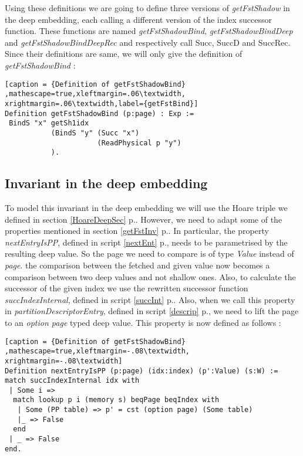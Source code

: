 Using these definitions we are going to define three versions of \textit{getFstShadow} in the deep embedding, each calling a different version of the index successor function. These functions are named \textit{getFstShadowBind}, \textit{getFstShadowBindDeep} and \textit{getFstShadowBindDeepRec} and respectively call Succ, SuccD and SuccRec. Since their definitions are same, we will only give the definition of \textit{getFstShadowBind} :

\begin{lstlisting}[caption = {Definition of getFstShadowBind} ,mathescape=true,xleftmargin=.06\textwidth,
xrightmargin=.06\textwidth,label={getFstBind}]
Definition getFstShadowBind (p:page) : Exp :=
 BindS "x" getSh1idx 
           (BindS "y" (Succ "x") 
                      (ReadPhysical p "y")
           ).
\end{lstlisting}
 
\subsection{Invariant in the deep embedding}
To model this invariant in the deep embedding we will use the Hoare triple we defined in section \ref{HoareDeepSec} p.\pageref{HoareDeepSec}. However, we need to adapt some of the properties mentioned in section \ref{getFstInv} p.\pageref{getFstInv}. In particular, the property \textit{nextEntryIsPP}, defined in script \ref{nextEnt} p.\pageref{nextEnt}, needs to be parametrised by the resulting deep value. So the page we need to compare is of type \textit{Value} instead of \textit{page}. the comparison between the fetched and given value now becomes a comparison between two deep values and not shallow ones. Also, to calculate the successor of the given index we use the rewritten successor function \textit{succIndexInternal}, defined in script \ref{succInt} p.\pageref{succInt}. Also, when we call this property in \textit{partitionDescriptorEntry}, defined in script \ref{descrip} p.\pageref{descrip}, we need to lift the page to an \textit{option page} typed deep value. This property is now defined as follows : 
\begin{lstlisting}[caption = {Definition of getFstShadowBind} ,mathescape=true,xleftmargin=-.08\textwidth,
xrightmargin=-.08\textwidth]
Definition nextEntryIsPP (p:page) (idx:index) (p':Value) (s:W) := 
match succIndexInternal idx with 
 | Some i => 
  match lookup p i (memory s) beqPage beqIndex with 
   | Some (PP table) => p' = cst (option page) (Some table)
   |_ => False 
  end
 | _ => False 
end.
\end{lstlisting} \vspace{4pt}


